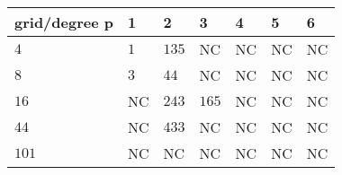 \begin{tabular}{lllllll}
\hline
 grid/degree p   & 1   & 2     & 3     & 4   & 5   & 6   \\
\hline
 $4$             & $1$ & $135$ & NC    & NC  & NC  & NC  \\
 $8$             & $3$ & $44$  & NC    & NC  & NC  & NC  \\
 $16$            & NC  & $243$ & $165$ & NC  & NC  & NC  \\
 $44$            & NC  & $433$ & NC    & NC  & NC  & NC  \\
 $101$           & NC  & NC    & NC    & NC  & NC  & NC  \\
\hline
\end{tabular}